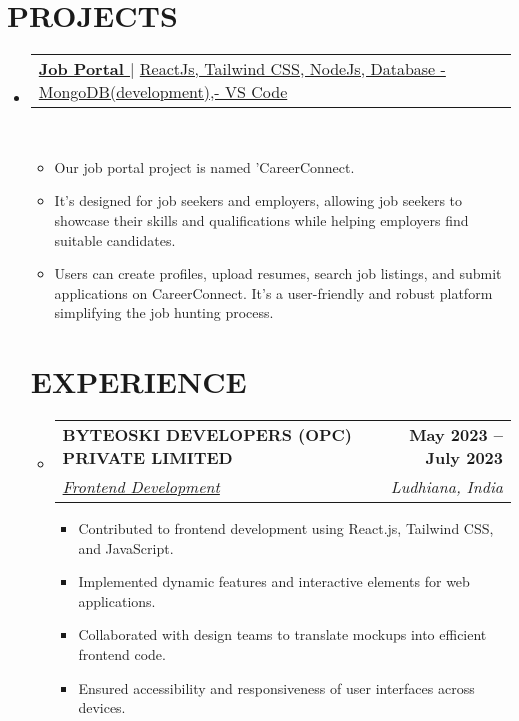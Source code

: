 \documentclass[letterpaper,11pt]{article}
\makeatletter
\newcommand{\resumeItem}[1]{
  \item\small{
    {#1 \vspace{-2pt}}
  }
}
\newcommand{\resumeSubheading}[4]{
  \vspace{-2pt}\item
    \begin{tabular*}{1.0\textwidth}[t]{l@{\extracolsep{\fill}}r}
      \textbf{\large#1} & \textbf{\small #2} \\
      \textit{\large#3} & \textit{\small #4} \\
      
    \end{tabular*}\vspace{-7pt}
}
\newcommand{\resumeProjectHeading}[2]{
    \item
    \begin{tabular*}{1.001\textwidth}{l@{\extracolsep{\fill}}r}
      \small#1 & \textbf{\small #2}\\
    \end{tabular*}\vspace{-7pt}
}
\newcommand{\resumeSubHeadingListStart}{\begin{itemize}[leftmargin=0.0in, label={}]}
\newcommand{\resumeSubHeadingListEnd}{\end{itemize}}
\newcommand{\resumeItemListStart}{\begin{itemize}}
\newcommand{\resumeItemListEnd}{\end{itemize}\vspace{-5pt}}
\makeatother
\begin{document}


\section{PROJECTS}
    \vspace{-5pt}
    \resumeSubHeadingListStart
    \resumeProjectHeading
          {{\textbf{\large{\underline{Job Portal }}} } $|$ \large{\underline{ReactJs, Tailwind CSS,  NodeJs, Database - MongoDB(development),- VS Code}}}{}\\
          \resumeItemListStart
            \resumeItem {\normalsize { Our job portal project is named 'CareerConnect.}}
            \resumeItem{\normalsize{It's designed for job seekers and employers, allowing job seekers to showcase their skills and qualifications while helping employers find suitable candidates.}}
            \resumeItem{\normalsize{Users can create profiles, upload resumes, search job listings, and submit applications on CareerConnect. It's a user-friendly and robust platform simplifying the job hunting process.}}
            \resumeItemListEnd 
       
       
   \vspace*{0.5\multicolsep}
\section{EXPERIENCE}
  \vspace{-5pt}
  \resumeSubHeadingListStart

    \resumeSubheading
      {
BYTEOSKI DEVELOPERS (OPC) PRIVATE LIMITED \href{https://drive.google.com/file/d/1XxwjN032-ViZekXshojBQBrxkQl0g9YT/view}{\raisebox{-0.1\height}\faExternalLink }}{May 2023 -- July 2023} 
      {\underline{Frontend Development}}{Ludhiana, India}
  
    \resumeItemListStart \resumeItem{\normalsize{Contributed to frontend development using React.js, Tailwind CSS, and JavaScript.}}
  \resumeItem{\normalsize{Implemented dynamic features and interactive elements for web applications.}}
  \resumeItem{\normalsize{Collaborated with design teams to translate mockups into efficient frontend code.}}
   \resumeItem{\normalsize{Ensured accessibility and responsiveness of user interfaces across devices.}}
\resumeItemListEnd
  
      \resumeItemListEnd  
  \resumeSubHeadingListEnd
\vspace{-12pt}
\end{document}
